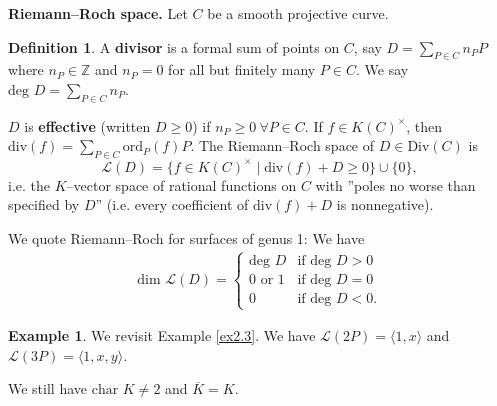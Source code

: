 \documentclass{article}
\theoremstyle{definition}
\newtheorem{example}{Example}[section]
\newtheorem{defn}{Definition}[section]
\begin{document}
\textbf{Riemann--Roch space.} Let $C$ be a smooth projective curve. 
\begin{defn}
    A \textbf{divisor} is a formal sum of points on $C$, say $D = \sum_{P \in C}^{} n_P P$ where $n_P \in \mathbb{Z}$ and $n_P = 0$ for all but finitely many $P \in C$. We say $\text{deg }D= \sum_{P \in C}^{} n_P$.
    \vspace{1mm}
     
    $D$ is \textbf{effective} (written $D\ge 0$) if $n_P \ge 0 ~\forall P \in C$. If $f \in K(C)^\times$, then $\text{div}(f) = \sum_{P \in C}^{} \text{ord}_P(f)P$. The Riemann--Roch space of $D \in \text{Div}(C)$ is  
    \[
        \mathcal{L}(D) = \{f \in K(C)^\times \mid \text{div}(f) + D \ge 0\} \cup \{0\},
    \]
    i.e. the $K$--vector space of rational functions on $C$ with ''poles no worse than specified by $D$'' (i.e. every coefficient of $\text{div}(f)+D$ is nonnegative).
\end{defn}
We quote Riemann--Roch for surfaces of genus 1: We have
\begin{align*}
    \text{dim }\mathcal{L}(D) = \begin{cases}
        \text{deg }D &\text{if deg }D>0\\
        0 \text{ or }1 &\text{if deg }D=0\\
        0 &\text{if deg }D<0.
    \end{cases}
\end{align*}
\begin{example}
    We revisit Example \ref{ex2.3}. We have $\mathcal{L}(2P) = \langle 1,x \rangle$ and $\mathcal{L}(3P) = \langle 1,x,y \rangle$.
\end{example}


We still have $\text{char }K \neq 2$ and $\overline{K} = K$.
\end{document}
